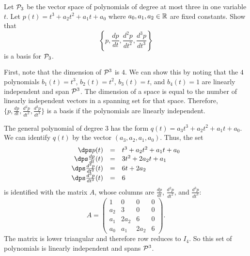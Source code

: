 \documentclass{article}
\begin{document}



\problemlabel

\begin{exercise} \label{c5.5.6}
Let ${\cal P}_3$ be the vector space of polynomials of degree at
most three in one variable $t$.  Let $p(t)=t^3+a_2t^2+a_1t+a_0$ where
$a_0,a_1,a_2\in\mathbb R$ are fixed constants.  Show that
\[
\left\{ p, \frac{dp}{dt}, \frac{d^2p}{dt^2}, \frac{d^3p}{dt^3}\right\}
\]
is a basis for ${\cal P}_3$.

\begin{solution}

First, note that the dimension of ${\cal P}^3$ is $4$.  We can show
this by noting that the $4$ polynomials $b_1(t) = t^3$, $b_2(t) =
t^2$, $b_3(t) = t$, and $b_4(t) = 1$ are linearly independent and
span ${\cal P}^3$.  The dimension of a space is equal to the number of
linearly independent vectors in a spanning set for that space.
Therefore, $\{p, \frac{dp}{dt}, \frac{d^2p}{dt^2}, \frac{d^3p}{dt^3}\}$
is a basis if the polynomials are linearly independent.

\para The general polynomial of degree $3$ has the form $q(t) =
a_3t^3 + a_2t^2 + a_1t + a_0$.  We can identify $q(t)$ by the vector 
$(a_3,a_2,a_1,a_0)$.  Thus, the set
\[
\begin{array}{rcl}
\dps p(t) & = & t^3 + a_2t^2 + a_1t + a_0 \\
\dps \frac{dp}{dt}(t) & = & 3t^2 + 2a_2t + a_1 \\
\dps \frac{d^2p}{dt^2}(t) & = & 6t + 2a_2 \\
\dps \frac{d^3p}{dt^3}(t) & = & 6 \end{array}
\]
is identified with the matrix $A$, whose columns are 
$\frac{dp}{dt}$, $\frac{d^2p}{dt^2}$, and $\frac{d^3p}{dt^3}$:
\[ A = \left(\begin{array}{cccc} 1 & 0 & 0 & 0 \\
a_2 & 3 & 0 & 0 \\ a_1 & 2a_2 & 6 & 0 \\ a_0 & a_1 & 2a_2 & 6
\end{array}\right). \]
The matrix is lower triangular and therefore row reduces to $I_4$.  So
this set of polynomials is linearly independent and spans ${\cal P}^3$.

\end{solution}
\end{exercise}
\end{document}
